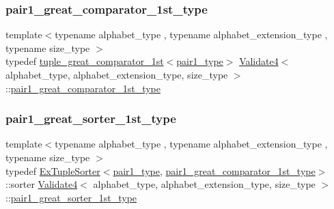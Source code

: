 \subsubsection{\texorpdfstring{pair1\+\_\+great\+\_\+comparator\+\_\+1st\+\_\+type}{pair1\_great\_comparator\_1st\_type}}
{\footnotesize\ttfamily template$<$typename alphabet\+\_\+type , typename alphabet\+\_\+extension\+\_\+type , typename size\+\_\+type $>$ \\
typedef \hyperlink{structtuple__great__comparator__1st}{tuple\+\_\+great\+\_\+comparator\+\_\+1st}$<$\hyperlink{class_validate4_aaa2fcb80a05115eb4ca02ab23df8827e}{pair1\+\_\+type}$>$ \hyperlink{class_validate4}{Validate4}$<$ alphabet\+\_\+type, alphabet\+\_\+extension\+\_\+type, size\+\_\+type $>$\+::\hyperlink{class_validate4_a3a6678b617cc9e0d65b36595cdd12a83}{pair1\+\_\+great\+\_\+comparator\+\_\+1st\+\_\+type}\hspace{0.3cm}{\ttfamily [private]}}

\mbox{\label{class_validate4_ac379442c631fdd03a2e64223cea2c911}} 
\subsubsection{\texorpdfstring{pair1\+\_\+great\+\_\+sorter\+\_\+1st\+\_\+type}{pair1\_great\_sorter\_1st\_type}}
{\footnotesize\ttfamily template$<$typename alphabet\+\_\+type , typename alphabet\+\_\+extension\+\_\+type , typename size\+\_\+type $>$ \\
typedef \hyperlink{struct_ex_tuple_sorter}{Ex\+Tuple\+Sorter}$<$\hyperlink{class_validate4_aaa2fcb80a05115eb4ca02ab23df8827e}{pair1\+\_\+type}, \hyperlink{class_validate4_a3a6678b617cc9e0d65b36595cdd12a83}{pair1\+\_\+great\+\_\+comparator\+\_\+1st\+\_\+type}$>$\+::sorter \hyperlink{class_validate4}{Validate4}$<$ alphabet\+\_\+type, alphabet\+\_\+extension\+\_\+type, size\+\_\+type $>$\+::\hyperlink{class_validate4_ac379442c631fdd03a2e64223cea2c911}{pair1\+\_\+great\+\_\+sorter\+\_\+1st\+\_\+type}\hspace{0.3cm}{\ttfamily [private]}}

\mbox{\label{class_validate4_af01005bf9ba711e95fc52fc41e323716}} 
